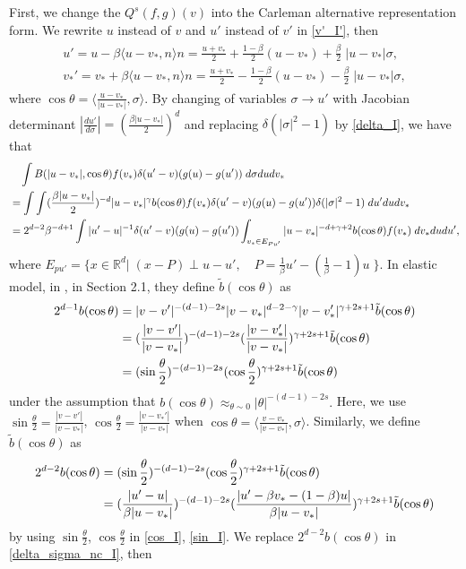 \documentclass[reqno,10pt]{amsart}
\numberwithin{equation}{section}
\begin{document}
\noindent First, we change the $Q^{s}(f,g)(v)$ into the Carleman alternative representation form.
We rewrite $u$ instead of $v$ and $u'$ instead of $v'$ in \eqref{v'_I'}, then 
\begin{align} \label{u'_I}
\begin{split}
    u'=u-\beta\langle u-v_*,n \rangle {n}
    =\frac{u+v_*}{2}+\frac{1-\beta}{2}(u-v_*)+\frac{\beta}{2}\;|u-v_*|{\sigma}, \\
     v_*'=v_*+\beta\langle u-v_*,n \rangle {n}=\frac{u+v_*}{2}-\frac{1-\beta}{2}(u-v_*)-\frac{\beta}{2}\;|u-v_*|{\sigma},
\end{split}
\end{align} where $\cos \theta = \langle \frac{u-v_*}{|u-v_*|}, \sigma \rangle.$ By changing of variables $\sigma \rightarrow u'$ with Jacobian determinant $|\frac{d u'}{d\sigma}|= (\frac{\beta|u-v_*|}{2})^{d}$ and replacing $\delta(|\sigma|^2-1)$ by \eqref{delta_I}, we have that
\begin{align} 
    &\quad\int B(|u-v_*|,\cos\theta)f(v_*)\delta(u'-v)(g(u)-g(u')) \; d\sigma du dv_* \notag \\
     &=\int\int (\frac{\beta|u-v_*|}{2})^{-d}|u-v_*|^{\gamma}b(\cos\theta)f(v_*)\delta(u'-v)(g(u)-g(u'))\delta(|\sigma|^2-1) \; du'dudv_* \notag \\
    &=2^{d-2}\beta^{-d+1}\int |u'-u|^{-1}\delta(u'-v)(g(u)-g(u'))\int_{v_*\in E_{Pu'}} |u-v_*|^{-d+\gamma+2}b(\cos\theta)f(v_*)\; dv_*dudu', \label{delta_sigma_nc_I}
\end{align} where  $E_{pu'}=\{x \in \mathbb{R}^d|\; (x-P)\;\bot \;u-u' , \quad P=\frac{1}{\beta}u'-(\frac{1}{\beta}-1)u \;\}.$ 
In elastic model, in \cite{IM2020}, in Section 2.1, they define 
$\tilde{b}(\cos\theta)$ as
\begin{align*}
2^{d-1}b(\cos\theta)&=|v-v'|^{-(d-1)-2s}|v-v_*|^{d-2-\gamma}|v-v_*'|^{\gamma+2s+1}\tilde{b}(\cos\theta) \notag \\
&=(\frac{|v-v'|}{|v-v_*|})^{-(d-1)-2s}(\frac{|v-v_*'|}{|v-v_*|})^{\gamma+2s+1}\tilde{b}(\cos\theta) \notag \\
&=(\sin\frac{\theta}{2})^{-(d-1)-2s}(\cos\frac{\theta}{2})^{\gamma+2s+1}\tilde{b}(\cos\theta)
\end{align*} under the assumption that $b(\cos\theta) \approx_{\theta \sim 0} |\theta|^{-(d-1)-2s}.$ Here, we use $\sin\frac{\theta}{2}=\frac{|v-v'|}{|v-v_*|}$, 
$\cos\frac{\theta}{2}=\frac{|v-v_*'|}{|v-v_*|}$ when
$\cos\theta = \langle\frac{v-v_*}{|v-v_*|},\sigma\rangle$. Similarly, we define $\tilde{b}(\cos\theta)$ as
\begin{align} \label{b_nc_I}
    2^{d-2}b(\cos\theta)&= (\sin\frac{\theta}{2})^{-(d-1)-2s}(\cos\frac{\theta}{2})^{\gamma+2s+1}\tilde{b}(\cos\theta) \notag \\ &= (\frac{|u'-u|}{\beta|u-v_*|})^{-(d-1)-2s}(\frac{|u'-\beta v_*-(1-\beta)u|}{\beta|u-v_*|})^{\gamma+2s+1} \tilde{b}(\cos\theta)
\end{align} by using $\sin \frac{\theta}{2}$,  $\cos \frac{\theta}{2}$ in \eqref{cos_I}, \eqref{sin_I}. We
replace $2^{d-2}b(\cos\theta)$ in \eqref{delta_sigma_nc_I}, then 
\end{document}
